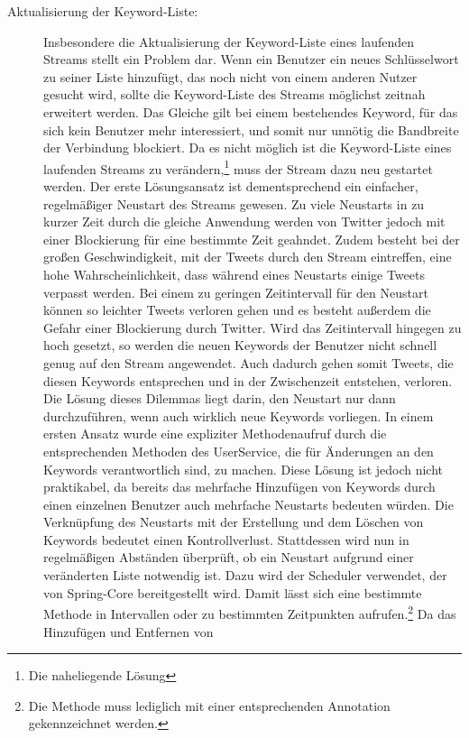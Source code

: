 \begin{description}
	\item [Aktualisierung der Keyword-Liste:] Insbesondere die Aktualisierung der Keyword-Liste eines laufenden Streams stellt ein Problem dar. Wenn ein Benutzer ein neues Schlüsselwort zu seiner Liste hinzufügt, das noch nicht von einem anderen Nutzer gesucht wird, sollte die Keyword-Liste des Streams möglichst zeitnah erweitert werden. Das Gleiche gilt bei einem bestehendes Keyword, für das sich kein Benutzer mehr interessiert, und somit nur unnötig die Bandbreite der Verbindung blockiert. Da es nicht möglich ist die Keyword-Liste eines laufenden Streams zu verändern,\footnote{Die naheliegende Lösung} muss der Stream dazu neu gestartet werden. %
		Der erste Lösungsansatz ist dementsprechend ein einfacher, regelmäßiger Neustart des 
		Streams gewesen. Zu viele Neustarts in zu kurzer Zeit durch die gleiche Anwendung werden 
		von Twitter jedoch mit einer Blockierung für eine bestimmte Zeit geahndet. Zudem besteht 
		bei der großen Geschwindigkeit, mit der Tweets durch den Stream eintreffen, eine hohe 
		Wahrscheinlichkeit, dass während eines Neustarts einige Tweets verpasst werden. Bei einem 
		zu geringen Zeitintervall für den Neustart können so leichter Tweets verloren gehen und es 
		besteht außerdem die Gefahr einer Blockierung durch Twitter. Wird das Zeitintervall 
		hingegen zu hoch gesetzt, so werden die neuen Keywords der Benutzer nicht schnell genug 
		auf den Stream angewendet. Auch dadurch gehen somit Tweets, die diesen Keywords 
		entsprechen und in der Zwischenzeit entstehen, verloren.
		Die Lösung dieses Dilemmas liegt darin, den Neustart nur dann durchzuführen, wenn auch 
		wirklich neue Keywords vorliegen. In einem ersten Ansatz wurde eine expliziter 
		Methodenaufruf durch die entsprechenden Methoden des UserService, die für Änderungen an 
		den Keywords verantwortlich sind, zu machen. Diese Lösung ist jedoch nicht praktikabel, da 
		bereits das mehrfache Hinzufügen von Keywords durch einen einzelnen Benutzer auch 
		mehrfache Neustarts bedeuten würden. Die Verknüpfung des Neustarts mit der Erstellung und 
		dem Löschen von Keywords bedeutet einen Kontrollverlust.
		Stattdessen wird nun in regelmäßigen Abständen überprüft, ob ein Neustart aufgrund einer 
		veränderten Liste notwendig ist. Dazu wird der Scheduler verwendet, der von Spring-Core 
		bereitgestellt wird. Damit lässt sich eine bestimmte Methode in Intervallen oder zu 
		bestimmten Zeitpunkten aufrufen.\footnote{Die Methode muss lediglich mit einer 
		entsprechenden Annotation gekennzeichnet werden.} Da das Hinzufügen und Entfernen von 

\end{description}
